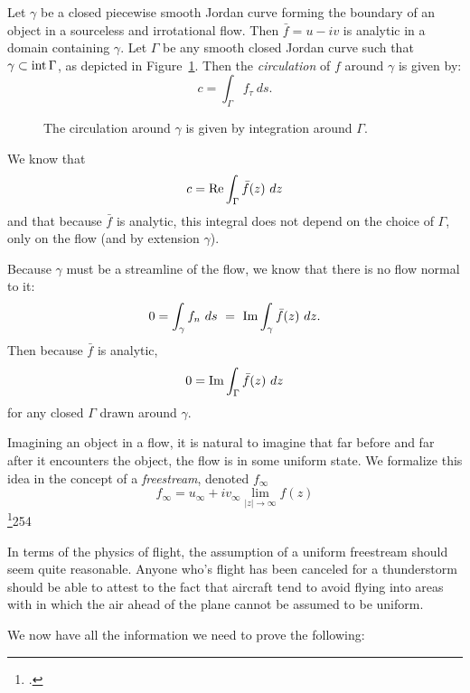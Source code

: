 \documentclass[letterpaper, twoside, 12 pt]{article}
\begin{document}
	\begin{definition}[Circulation]
		Let $\gamma$ be a closed piecewise smooth Jordan curve forming the boundary of an object in a sourceless and irrotational flow. 
		Then $\bar f  = u - iv$ is analytic in a domain containing $\gamma$.
		Let $\Gamma$ be any smooth closed Jordan curve such that $\gamma \subset \intr \Gamma$, as depicted in Figure~\ref{fig:circulation}.
		Then the \textit{circulation} of $f$ around $\gamma$ is given by:
		\[
			c = \int_\Gamma f_\tau \ ds.
		\]
	\end{definition}
	\begin{figure}[H]
		\centering
		\begin{tikzpicture}
			
		\end{tikzpicture}
		\captionsetup{width = 0.5 \textwidth}
		\caption{
			The circulation around $\gamma$ is given by integration around $\Gamma$.
		}
		\label{fig:circulation}
	\end{figure}

	\begin{remark}
		We know that 
		\[
			c = \re \int_\Gamma \bar f(z) \ dz
		\]
		and that because $\bar f$ is analytic, this integral does not depend on the choice of $\Gamma$, only on the flow (and by extension $\gamma$).

		Because $\gamma$ must be a streamline of the flow, we know that there is no flow normal to it:
		\[
			0 = \int_\gamma f_n \ ds \ = \ \im \int_\gamma \bar f(z) \ dz.
		\]
		Then because $\bar f$ is analytic, 
		\[
			0 = \im \int_\Gamma \bar f (z)\ dz
		\]
		for any closed $\Gamma$ drawn around $\gamma$.
	\end{remark}

	\begin{definition}[Freestream]
		Imagining an object in a flow, it is natural to imagine that far before and far after it encounters the object, the flow is in some uniform state.
		We formalize this idea in the concept of a \textit{freestream}, denoted $f_\infty$
		\[
			f_\infty = u_\infty + i v_\infty \lim_{|z| \to \infty} f(z)
		\]
		\footcite{fisher}{254}
	\end{definition}

	\begin{remark}
		In terms of the physics of flight, the assumption of a uniform freestream should seem quite reasonable.
		Anyone who's flight has been canceled for a thunderstorm should be able to attest to the fact that aircraft tend to avoid flying into areas with in which the air ahead of the plane cannot be assumed to be uniform.
	\end{remark}
	We now have all the information we need to prove the following:
\end{document}
